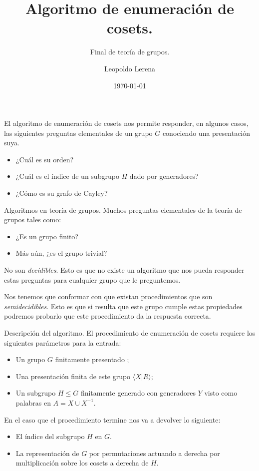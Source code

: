 \documentclass[aspectratio=169, 9pt]{beamer}
\title{Algoritmo de enumeración de cosets.}
\subtitle{Final de teoría de grupos.}
\date{\today}
\author{Leopoldo Lerena}
\institute{Universidad de Buenos Aires}
\newcommand{\fg}{finitamente generado }
\newcommand{\fp}{finitamente presentado }
\begin{document}
\maketitle

\begin{frame}[fragile]{}

El algoritmo de enumeración de cosets nos permite responder, en algunos casos, las siguientes preguntas elementales de un grupo $G$ conociendo una presentación suya.

\begin{itemize}
	\item ¿Cuál es su orden?
	\pause
	\item ¿Cuál es 	el índice de un subgrupo $H$ dado por generadores?
	\pause
	\item ¿Cómo es su grafo de Cayley?
\end{itemize}
\end{frame}

\begin{frame}[fragile]{Algoritmos en teoría de grupos.}
	Muchos preguntas elementales de la teoría de grupos tales como:
	\begin{itemize}
		\item ¿Es un grupo finito?
		\pause
		\item Más aún, ¿es el grupo trivial?
	\end{itemize}
	\pause
	No son \textit{decidibles}. 
	Esto es que no existe un algoritmo que nos pueda responder estas preguntas para cualquier grupo que le preguntemos.
	\medskip
	
	\pause
	
	
	Nos tenemos que conformar con que existan procedimientos que son \textit{semidecidibles}. 
	Esto es que si resulta que este grupo cumple estas propiedades podremos probarlo
	que este procedimiento da la respuesta correcta.
\end{frame}

\begin{frame}[fragile]{Descripción del algoritmo.}
	El procedimiento de enumeración de cosets requiere los siguientes parámetros para la entrada:
	\begin{itemize}
		\item Un grupo $G$ \fp;
		\pause
		\item Una presentación finita de este grupo $\langle X | R \rangle$;
		\pause
		\item Un subgrupo $H \le G$  \fg con generadores $Y$ visto como palabras en $A = X \cup X^{-1}$.
	\end{itemize}
	\pause
	\medskip
	
	En el caso que el procedimiento termine nos va a devolver lo siguiente:
	\begin{itemize}
		\item El índice del subgrupo $H$ en $G$.
		\pause
		\item La representación de $G$ por permutaciones actuando a derecha por multiplicación sobre los cosets a derecha de $H$.
		\pause 
	\end{itemize}  
\end{frame}
\end{document}
